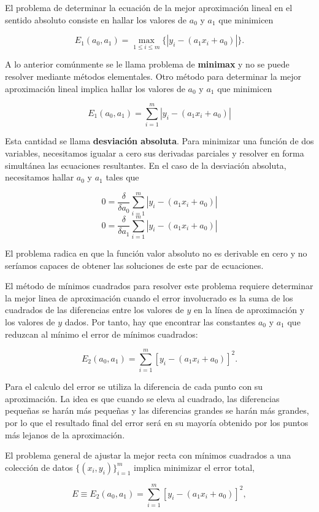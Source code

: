 El problema de determinar la ecuación de la mejor aproximación lineal en el sentido absoluto consiste en hallar los valores de $a_0$
y $a_1$ que minimicen

$$E_1(a_0, a_1) = \max_{1\leq i\leq m} \{|y_i - (a_1x_i + a_0)|\}.$$

A lo anterior comúnmente se le llama problema de \textbf{minimax} y no se puede resolver mediante métodos elementales.
Otro método para determinar la mejor aproximación lineal implica hallar los valores de $a_0$ y $a_1$ que minimicen

$$E_1(a_0, a_1) = \sum_{i=1}^m |y_i - (a_1x_i + a_0)|$$

Esta cantidad se llama \textbf{desviación absoluta}. Para minimizar una función de dos variables, necesitamos igualar a cero sus 
derivadas parciales y resolver en forma simultánea las ecuaciones resultantes. En el caso de la desviación absoluta, necesitamos hallar
$a_0$ y $a_1$ tales que 


	$$0 = \displaystyle{\dfrac{\delta}{\delta a_0} \sum_{i=1}^m |y_{i} - (a_1 x_i + a_0)|}$$
	$$0 = \displaystyle{\dfrac{\delta}{\delta a_1} \sum_{i=1}^m |y_{i} - (a_1 x_i + a_0)|}$$

El problema radica en que la función valor absoluto no es derivable en cero y no seríamos capaces de obtener las soluciones de este par
de ecuaciones.

El método de mínimos cuadrados para resolver este problema requiere determinar la mejor linea de aproximación cuando el error involucrado
es la suma de los cuadrados de las diferencias entre los valores de $y$ en la línea de aproximación y los valores de $y$ dados. Por tanto,
hay que encontrar las constantes $a_0$ y $a_1$ que reduzcan al mínimo el error de mínimos cuadrados:

$$E_2(a_0, a_1) = \sum_{i=1}^m \left[ y_i - (a_1x_i + a_0) \right]^2.$$

Para el calculo del error se utiliza la diferencia de cada punto con su aproximación. 
La idea es que cuando se eleva al cuadrado, las diferencias pequeñas se harán más pequeñas y las diferencias grandes se harán más grandes, 
por lo que el resultado final del error será en su mayoría obtenido por los puntos más lejanos de la aproximación.

El problema general de ajustar la mejor recta con mínimos cuadrados a una colección de datos $\{(x_i, y_i)\}_{i=1}^{m}$ implica minimizar
el error total,

$$E\equiv E_2(a_0, a_1) = \sum_{i=1}^{m} \left[ y_i - (a_1x_i + a_0) \right]^2,$$

